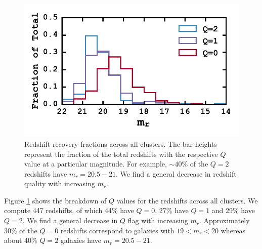 \begin{figure}
	\includegraphics[width=\textwidth]{figures2/redshiftHist.pdf} 
	\caption{Redshift recovery fractions across all clusters. The bar heights represent the fraction of the total redshifts with the respective $Q$ value at a particular magnitude. For example, $\sim 40\%$ of the $Q=2$ redshifts have $m_r = 20.5-21$. We find a general decrease in redshift quality with increasing $m_r$. } \label{fig:redshiftHist} 
\end{figure}

Figure \ref{fig:redshiftHist} shows the breakdown of $Q$ values for the redshifts across all clusters. We compute 447 redshifts, of which 44\% have $Q=0$, 27\% have $Q=1$ and 29\% have $Q=2$. We find a general decrease in $Q$ flag with increasing $m_r$. Approximately 30\% of the $Q=0$ redshifts correspond to galaxies with $19 < m_r <20$ whereas about 40\% $Q=2$ galaxies have $m_r = 20.5-21$.

